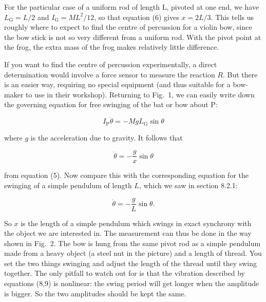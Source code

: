   For the particular case of a uniform rod of length L, pivoted at one end, we 
  have $L_{\mathrm{G}}=L/2$ and $I_{\mathrm{G}}=ML^2/12$, so that equation (6) 
  gives $x=2L/3$. This tells us roughly where to expect to find the centre of 
  percussion for a violin bow, since the bow stick is not so very different 
  from a uniform rod. With the pivot point at the frog, the extra mass of the 
  frog makes relatively little difference. 

  If you want to find the centre of percussion experimentally, a direct 
  determination would involve a force sensor to measure the reaction $R$. But 
  there is an easier way, requiring no special equipment (and thus suitable for 
  a bow-maker to use in their workshop). Returning to Fig.\ 1, we can easily 
  write down the governing equation for free swinging of the bat or bow about 
  P: 

  $$I_{\mathrm{P}} \ddot{\theta} = -MgL_{\mathrm{G}} \sin\theta \tag{7}$$ 

  where $g$ is the acceleration due to gravity. It follows that 

  $$\ddot{\theta} =-\frac{g}{x} \sin \theta \tag{8}$$ 

  from equation (5). Now compare this with the corresponding equation for the 
  swinging of a simple pendulum of length $L$, which we saw in section 8.2.1: 

  $$\ddot{\theta} =-\frac{g}{L} \sin \theta. \tag{9}$$ 

  So $x$ is the length of a simple pendulum which swings in exact synchrony 
  with the object we are interested in. The measurement can thus be done in the 
  way shown in Fig.\ 2. The bow is hung from the same pivot rod as a simple 
  pendulum made from a heavy object (a steel nut in the picture) and a length 
  of thread. You set the two things swinging and adjust the length of the 
  thread until they swing together. The only pitfall to watch out for is that 
  the vibration described by equations (8,9) is nonlinear: the swing period 
  will get longer when the amplitude is bigger. So the two amplitudes should be 
  kept the same. 